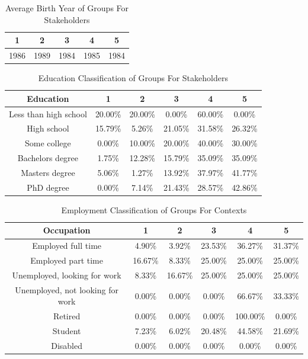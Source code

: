 \begin{table}[h!]
  \centering
  \caption{Average Birth Year of Groups For Stakeholders}
  \label{tab:year_stak}
  \begin{tabular}{ccccc}
    \toprule
     1&2&3&4&5\\
    \midrule
	1986& 1989& 1984& 1985& 1984\\
    \bottomrule
  \end{tabular}
\end{table}


\begin{table}[h!]
  \centering
  \caption{Education Classification of Groups For Stakeholders}
  \label{tab:edu_stak}
  \begin{tabular}{cccccc}
    \toprule
     Education&1&2&3&4&5\\
    \midrule
    
Less than high school	&20.00\%	&20.00\%	&0.00\%	&60.00\%	&0.00\%\\
High school	& 15.79\%&	5.26\%	&21.05\%	&31.58\%	&26.32\%\\
Some college	 & 0.00\%&	10.00\%	&20.00\%	&40.00\%&	30.00\%\\
Bachelors degree 	&1.75\%	&12.28\%&	15.79\%	&35.09\%	&35.09\%\\
Masters degree	&5.06\%	&1.27\%	&13.92\%	&37.97\%	&41.77\%\\
PhD degree	&0.00\%	&7.14\%	&21.43\%	&28.57\%	&42.86\%\\
    \bottomrule
  \end{tabular}
\end{table}








\begin{table}[h!]
  \centering
  \caption{Employment Classification of Groups For Contexts}
  \label{tab:emp_c}
  \begin{tabular}{cccccc}
    \toprule
     Occupation&1&2&3&4&5\\
    \midrule
Employed full time	&4.90\%	&3.92\%	&23.53\%	&36.27\%	&31.37\%\\
Employed part time	&16.67\%	&8.33\%	&25.00\%	&25.00\%	&25.00\%\\
Unemployed, looking for work	&8.33\%	&16.67\%	&25.00\%	&25.00\%	&25.00\%\\
Unemployed, not looking for work	&0.00\%	&0.00\%	&0.00\%	&66.67\%	&33.33\%\\
Retired	&0.00\%	&0.00\%	&0.00\%	&100.00\% &	0.00\%\\
Student	&7.23\%	&6.02\%	&20.48\%	&44.58\%	&21.69\%\\
Disabled	&0.00\%	&0.00\%	&0.00\%	&0.00\%	&0.00\%\\
    \bottomrule
  \end{tabular}
\end{table}



